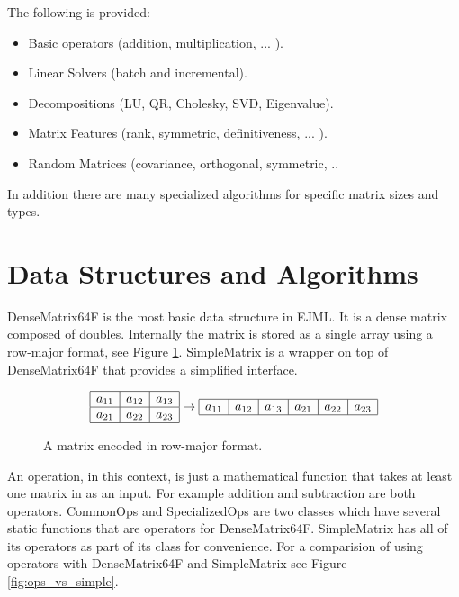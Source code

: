 \documentclass[12pt]{article}%
\begin{document}
The following is provided:
\begin{itemize}
\item Basic operators (addition, multiplication, ... ).
\item Linear Solvers (batch and incremental).
\item Decompositions (LU, QR, Cholesky, SVD, Eigenvalue).
\item Matrix Features (rank, symmetric, definitiveness, ... ).
\item Random Matrices (covariance, orthogonal, symmetric, ..
\end{itemize}


In addition there are many specialized algorithms for specific matrix sizes and types.  

\section{Data Structures and Algorithms}
\label{sec:structures}

DenseMatrix64F is the most basic data structure in EJML.  It is a dense matrix composed of doubles.  Internally the matrix is stored as a single array using a row-major format, see Figure \ref{fig:rowmajor}.  SimpleMatrix is a wrapper on top of DenseMatrix64F that provides a simplified interface.

\begin{figure}[h]
\begin{displaymath}
\begin{array}{|c|c|c|}
\hline
a_{11} & a_{12} & a_{13} \\  
\hline
a_{21} & a_{22} & a_{23} \\  
\hline
\end{array}
\rightarrow
\begin{array}{|c|c|c|c|c|c|}
\hline
a_{11} & a_{12} & a_{13} & a_{21} & a_{22} & a_{23} \\  
\hline
\end{array}
\end{displaymath}
\caption{\label{fig:rowmajor}A matrix encoded in row-major format.}
\end{figure}

An operation, in this context, is just a mathematical function that takes at least one matrix in as an input.  For example addition and subtraction are both operators.  CommonOps and SpecializedOps are two classes which have several static functions that are operators for DenseMatrix64F.  SimpleMatrix has all of its operators as part of its class for convenience.  For a comparision of using operators with DenseMatrix64F and SimpleMatrix see Figure \ref{fig:ops_vs_simple}.
\end{document}
